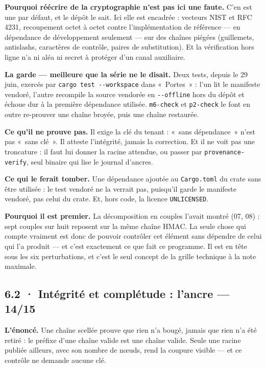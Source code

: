 \documentclass[10pt]{article}
\newcommand{\code}[1]{\texttt{\small #1}}
\begin{document}
\textbf{Pourquoi réécrire de la cryptographie n'est pas ici une faute.} C'en est une par défaut, et le dépôt le
sait. Ici elle est encadrée : vecteurs NIST et RFC 4231, recoupement octet à octet contre l'implémentation de
référence --- en dépendance de développement seulement --- sur des chaînes piégées (guillemets, antislashs,
caractères de contrôle, paires de substitution). Et la vérification hors ligne n'a ni aléa ni secret à protéger
d'un canal auxiliaire.

\textbf{La garde --- meilleure que la série ne le disait.} Deux tests, depuis le 29 juin, exercés par
\code{cargo test -{}-workspace} dans «~Portes~» : l'un lit le manifeste vendoré, l'autre recompile la source vendorée
en \code{-{}-offline} hors du dépôt et échoue dur à la première dépendance utilisée. \code{m6-check} et
\code{p2-check} le font en outre re-prouver une chaîne broyée, puis une chaîne restaurée.

\textbf{Ce qu'il ne prouve pas.} Il exige la clé du tenant : «~sans dépendance~» n'est pas «~sans clé~». Il atteste
l'intégrité, jamais la correction. Et il ne voit pas une troncature : il faut lui donner la racine attendue, ou
passer par \code{provenance-verify}, seul binaire qui lise le journal d'ancres.

\textbf{Ce qui le ferait tomber.} Une dépendance ajoutée au \code{Cargo.toml} du crate sans être utilisée : le test
vendoré ne la verrait pas, puisqu'il garde le manifeste vendoré, pas celui du crate. Et, hors code, la licence
\code{UNLICENSED}.

\textbf{Pourquoi il est premier.} La décomposition en couples l'avait montré (07, 08) : sept couples sur huit
reposent sur la même chaîne HMAC. La seule chose qui compte vraiment est donc de pouvoir contrôler cet élément sans
dépendre de celui qui l'a produit --- et c'est exactement ce que fait ce programme. Il est en tête sous les six
perturbations, et c'est le seul concept de la grille technique à la note maximale.

\subsection{6.2 · Intégrité et complétude : l'ancre --- 14/15}

\begin{these}
\textbf{L'énoncé.} Une chaîne scellée prouve que rien n'a bougé, jamais que rien n'a été retiré : le préfixe d'une
chaîne valide est une chaîne valide. Seule une racine publiée ailleurs, avec son nombre de nœuds, rend la coupure
visible --- et ce contrôle ne demande aucune clé.
\end{these}
\end{document}
